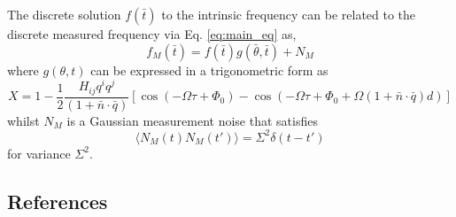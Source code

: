 \documentclass[fleqn,usenatbib,useAMS]{mnras}
\begin{document}
The discrete solution $f(\bar{t})$ to the intrinsic frequency can be related to the discrete measured frequency via Eq. \ref{eq:main_eq} as,
\begin{equation}
	f_M (\bar{t})= f(\bar{t}) g(\bar{\theta},\bar{t}) + N_M
\end{equation}
where $g(\theta,t)$ can be expressed in a trigonometric form as 
\begin{equation}
	X = 1 - \frac{1}{2} \frac{ H_{ij}q^i q^j }{(1 + \bar{n}\cdot \bar{q}) } \left[ \cos(-\Omega \tau +\Phi_0) - \cos(-\Omega \tau +\Phi_0 + \Omega (1 + \bar{n}\cdot \bar{q})  d) \right]
\end{equation} 
whilst $N_M$ is a Gaussian measurement noise that satisfies 
\begin{equation}
	\langle N_M(t) N_M(t') \rangle = \Sigma^2 \delta(t - t')
\end{equation}
for variance $\Sigma^2$. 









\subsection{References}
\label{sec:ref_list}













\bsp	%
\label{lastpage}
\end{document}
